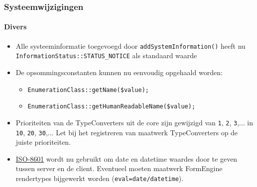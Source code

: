 \begin{frame}[fragile]
	\frametitle{Systeemwijzigingen}
	\framesubtitle{Divers}


	\begin{itemize}
		\item Alle systeeminformatie toegevoegd door \texttt{addSystemInformation()} heeft nu
			\texttt{InformationStatus::STATUS\_NOTICE} als standaard waarde
		\item De opsommingsconstanten kunnen nu eenvoudig opgehaald worden:

			\begin{itemize}
				\item \texttt{EnumerationClass::getName(\$value);}
				\item \texttt{EnumerationClass::getHumanReadableName(\$value);}
			\end{itemize}

		\item Prioriteiten van de TypeConverters uit de core zijn gewijzigd van \newline
			\texttt{1}, \texttt{2}, \texttt{3},... in \texttt{10}, \texttt{20}, \texttt{30},...
			Let bij het registreren van maatwerk TypeConverters op de juiste prioriteiten.

		\item \href{https://en.wikipedia.org/wiki/ISO_8601}{ISO-8601} wordt nu gebruikt om date en datetime
			waardes door te geven tussen server en de client. Eventueel moeten maatwerk FormEngine rendertypes
			bijgewerkt worden (\texttt{eval=date/datetime}).

	\end{itemize}

\end{frame}













